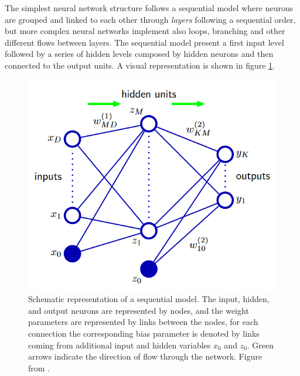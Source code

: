 The simplest neural network structure follows a sequential model where neurons are grouped and linked to each other through \textit{layers} following a sequential order, but more complex neural networks implement also loops, branching and other different flows between layers.
The sequential model present a first input level followed by a series of hidden levels composed by hidden neurons and then connected to the output units. A visual representation is shown in figure \ref{fig:NN_art}.\\

\begin{figure}
	\centering
	\includegraphics[width=.6\textwidth]{IMG/Cap6/NN_art.png}
	\caption{Schematic representation of a sequential model. The input, hidden, and output neurons are represented by nodes, and the weight parameters are represented by links between the nodes, for each connection the corresponding bias parameter is denoted by links coming from additional input and hidden variables $x_0$ and $z_0$. Green arrows indicate the direction of flow through the network. Figure from \cite{NN_Bishop}.}
	\label{fig:NN_art}
\end{figure}

